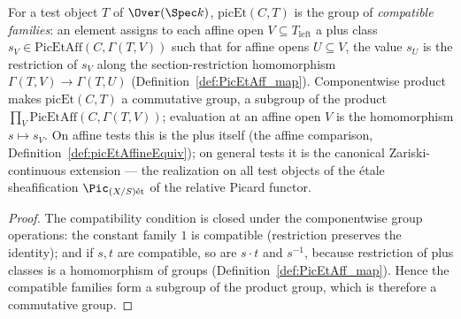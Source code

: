 \begin{definition}
  \label{def:picEt}
  \leanok
  For a test object \(T\) of \(\Over(\Spec k)\), \(\mathrm{picEt}(C, T)\) is the group of
  \emph{compatible families}: an element assigns to each affine open \(V \subseteq T_{\mathrm{left}}\)
  a plus class \(s_V \in \mathrm{PicEtAff}(C, \Gamma(T, V))\) such that for affine opens
  \(U \subseteq V\), the value \(s_U\) is the restriction of \(s_V\) along the section-restriction
  homomorphism \(\Gamma(T, V) \to \Gamma(T, U)\) (Definition~\ref{def:PicEtAff_map}). Componentwise
  product makes \(\mathrm{picEt}(C, T)\) a commutative group, a subgroup of the product
  \(\prod_{V} \mathrm{PicEtAff}(C, \Gamma(T, V))\); evaluation at an affine open \(V\) is the
  homomorphism \(s \mapsto s_V\). On affine tests this is the plus itself (the affine comparison,
  Definition~\ref{def:picEtAffineEquiv}); on general tests it is the canonical Zariski-continuous
  extension --- the realization on all test objects of the \'etale sheafification
  \(\Pic_{(X/S)\mathrm{\acute et}}\) of the relative Picard functor.
\end{definition}
\begin{proof}
  \leanok
  The compatibility condition is closed under the componentwise group operations: the constant
  family \(1\) is compatible (restriction preserves the identity); and if \(s, t\) are compatible,
  so are \(s \cdot t\) and \(s^{-1}\), because restriction of plus classes is a homomorphism of
  groups (Definition~\ref{def:PicEtAff_map}). Hence the compatible families form a subgroup of the
  product group, which is therefore a commutative group.
\end{proof}

